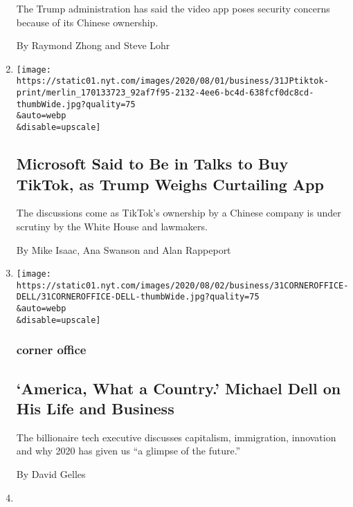 \begin{enumerate}
  The Trump administration has said the video app poses security
  concerns because of its Chinese ownership.

  By Raymond Zhong and Steve Lohr
\item
  \href{/2020/07/31/technology/tiktok-microsoft.html}{}

  \texttt{[image: https://static01.nyt.com/images/2020/08/01/business/31JPtiktok-print/merlin\_170133723\_92af7f95-2132-4ee6-bc4d-638fcf0dc8cd-thumbWide.jpg?quality=75\\\&auto=webp\\\&disable=upscale]}

  \hypertarget{microsoft-said-to-be-in-talks-to-buy-tiktok-as-trump-weighs-curtailing-app}{%
  \subsection{Microsoft Said to Be in Talks to Buy TikTok, as Trump
  Weighs Curtailing
  App}\label{microsoft-said-to-be-in-talks-to-buy-tiktok-as-trump-weighs-curtailing-app}}

  The discussions come as TikTok's ownership by a Chinese company is
  under scrutiny by the White House and lawmakers.

  By Mike Isaac, Ana Swanson and Alan Rappeport
\item
  \href{/2020/07/31/business/michael-dell-corner-office.html}{}

  \texttt{[image: https://static01.nyt.com/images/2020/08/02/business/31CORNEROFFICE-DELL/31CORNEROFFICE-DELL-thumbWide.jpg?quality=75\\\&auto=webp\\\&disable=upscale]}

  \hypertarget{corner-office}{%
  \subsubsection{corner office}\label{corner-office}}

  \hypertarget{america-what-a-country-michael-dell-on-his-life-and-business}{%
  \subsection{`America, What a Country.' Michael Dell on His Life and
  Business}\label{america-what-a-country-michael-dell-on-his-life-and-business}}

  The billionaire tech executive discusses capitalism, immigration,
  innovation and why 2020 has given us ``a glimpse of the future.''

  By David Gelles
\item
  \href{/2020/07/31/your-money/birkin-bag-racehorse-invest.html}{}


\end{enumerate}
